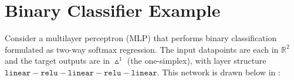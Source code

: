 


\section{Binary Classifier Example}
Consider a multilayer perceptron (MLP) that performs binary classification formulated as two-way softmax regression. The input datapoints are each in $\mathbb{R}^2$ and the target outputs are in $\vartriangle^1$ (the one-simplex), %
with layer structure $\texttt{linear}-\texttt{relu}-\texttt{linear}-\texttt{relu}-\texttt{linear}$. This network is drawn below in \fig{\ref{fig:neural_nets:simple_MLP_network2}}:

